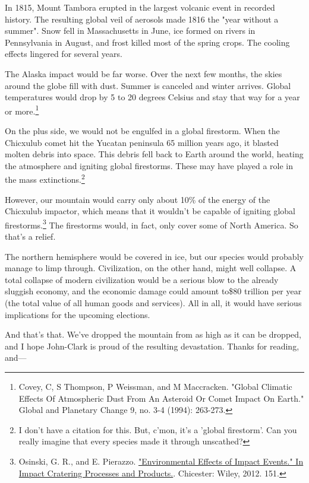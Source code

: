 {{In 1815, Mount Tambora erupted in the largest volcanic event in recorded history. The resulting global veil of aerosols made 1816 the "year without a summer". Snow fell in Massachusetts in June, ice formed on rivers in Pennsylvania in August, and frost killed most of the spring crops. The cooling effects lingered for several years.}

{The Alaska impact would be far worse. Over the next few months, the skies around the globe fill with dust. Summer is canceled and winter arrives. Global temperatures would drop by 5 to 20 degrees Celsius and stay that way for a year or more.{\footnote{Covey, C, S Thompson, P Weissman, and M Maccracken. "Global Climatic Effects Of Atmospheric Dust From An Asteroid Or Comet Impact On Earth." Global and Planetary Change 9, no. 3-4 (1994): 263-273.} } }

{On the plus side, we would not be engulfed in a global firestorm. When the Chicxulub comet hit the Yucatan peninsula 65 million years ago, it blasted molten debris into space. This debris fell back to Earth around the world, heating the atmosphere and igniting global firestorms. These may have played a role in the mass extinctions.{\footnote{I don't have a citation for this. But, c'mon, it's a 'global firestorm'. Can you really imagine that every species made it through unscathed?} } }

{However, our mountain would carry only about 10\% of the energy of the Chicxulub impactor, which means that it wouldn't be capable of igniting global firestorms.{\footnote{Osinski, G. R., and E. Pierazzo. \href{http://books.google.com/books?id=3Vzky11ZR3UC&lpg=PA149&ots=8kqLGZFB1g&pg=PA151\#v=onepage&q&f=false}{"Environmental Effects of Impact Events." In Impact Cratering Processes and Products.}. Chicester: Wiley, 2012. 151.} } The firestorms would, in fact, only cover some of North America. So that's a relief.}

{The northern hemisphere would be covered in ice, but our species would probably manage to limp through. Civilization, on the other hand, might well collapse. A total collapse of modern civilization would be a serious blow to the already sluggish economy, and the economic damage could amount to\$80 trillion per year (the total value of all human goods and services). All in all, it would have serious implications for the upcoming elections.}

{And that's that. We've dropped the mountain from as high as it can be dropped, and I hope John-Clark is proud of the resulting devastation. Thanks for reading, and—}

}
